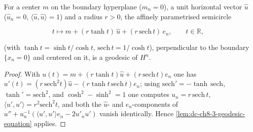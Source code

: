 \begin{lemma}
  \label{lem:dc-ch8-3-semicircle-geodesic}
  \leanok
  For a center $m$ on the boundary hyperplane ($m_n=0$), a unit horizontal vector
  $\hat u$ ($\hat u_n=0$, $\langle\hat u,\hat u\rangle=1$) and a radius $r>0$, the
  affinely parametrised semicircle

  $$
  t\longmapsto m+(r\tanh t)\,\hat u+(r\,\mathrm{sech}\,t)\,e_n,\qquad t\in\mathbb R,
  $$

  (with $\tanh t=\sinh t/\cosh t$, $\mathrm{sech}\,t=1/\cosh t$), perpendicular to
  the boundary $\{x_n=0\}$ and centered on it, is a geodesic of $H^n$.
\end{lemma}
\begin{proof}
  \leanok
\sketch
  With $u(t)=m+(r\tanh t)\hat u+(r\,\mathrm{sech}\,t)e_n$ one has
  $u'(t)=(r\,\mathrm{sech}^2 t)\hat u-(r\tanh t\,\mathrm{sech}\,t)e_n$; using
  $\mathrm{sech}'=-\tanh\,\mathrm{sech}$, $\tanh'=\mathrm{sech}^2$, and
  $\cosh^2-\sinh^2=1$ one computes $u_n=r\,\mathrm{sech}\,t$,
  $\langle u',u'\rangle=r^2\mathrm{sech}^2 t$, and both the $\hat u$- and
  $e_n$-components of $u''+u_n^{-1}(\langle u',u'\rangle e_n-2u'_n u')$ vanish
  identically. Hence \cref{lem:dc-ch8-3-geodesic-equation} applies.
\end{proof}

